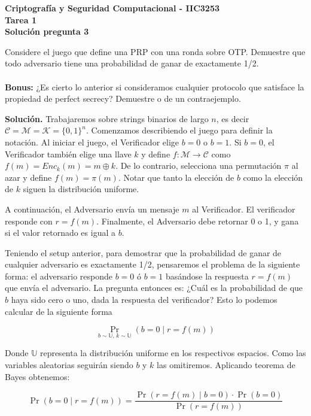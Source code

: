 \documentclass[11pt]{article}
\begin{document}
\begin{center}
  \bf Criptografía y Seguridad Computacional - IIC3253\\
  \bf Tarea 1\\
  \bf Solución pregunta 3
\end{center}

\bigskip

\noindent
Considere el juego que define una PRP con una ronda sobre OTP. Demuestre que todo adversario tiene una probabilidad de ganar de exactamente 1/2.
\\
\\
\textbf{Bonus:} ¿Es cierto lo anterior si consideramos cualquier protocolo que satisface la propiedad de perfect secrecy? Demuestre o de un contraejemplo.

\bigskip

\noindent
{\bf Solución.} Trabajaremos sobre strings binarios de largo $n$, es decir $\mathcal{C}=\mathcal{M}=\mathcal{K}=\{0,1\}^n$. Comenzamos describiendo el juego para definir la notación. Al iniciar el juego, el Verificador elige $b=0$ o $b=1$. Si $b=0$, el Verificador también elige una llave $k$ y define $f:\mathcal{M}\rightarrow\mathcal{C}$ como $f(m)=\textit{Enc}_k(m)=m\oplus k$. De lo contrario, selecciona una permutación $\pi$ al azar y define $f(m)=\pi(m)$. Notar que tanto la elección de $b$ como la elección de $k$ siguen la distribución uniforme.

A continuación, el Adversario envía un mensaje $m$ al Verificador. El verificador responde con $r=f(m)$. Finalmente, el Adversario debe retornar 0 o 1, y gana si el valor retornado es igual a $b$.

Teniendo el setup anterior, para demostrar que la probabilidad de ganar de cualquier adversario es exactamente 1/2, pensaremos el problema de la siguiente forma: el adversario responde $b=0$ ó $b=1$ basándose la respuesta $r=f(m)$ que envía el adversario. La pregunta entonces es: ¿Cuál es la probabilidad de que $b$ haya sido cero o uno, dada la respuesta del verificador? Esto lo podemos calcular de la siguiente forma

$$\Pr_{b\sim \mathbb{U},\, k\sim \mathbb{U}}(b=0 \mid r=f(m))$$

Donde $\mathbb{U}$ representa la distribución uniforme en los respectivos espacios. Como las variables aleatorias seguirán siendo $b$ y $k$ las omitiremos. Aplicando teorema de Bayes obtenemos:

$$\Pr(b=0 \mid r=f(m))=
\frac{
  \Pr(r=f(m) \mid b=0)\cdot\Pr(b=0)
  }{
    \Pr(r=f(m))
}
$$
\end{document}
